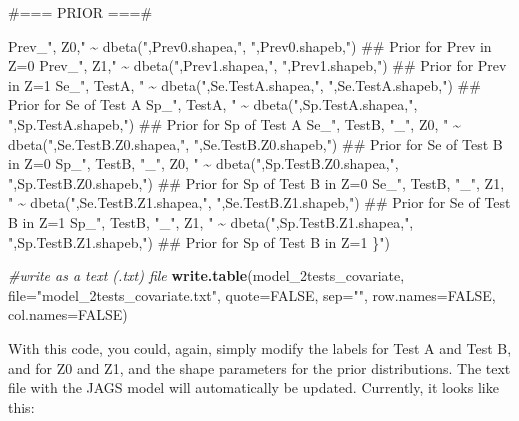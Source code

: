 \documentclass[
]{book}
\newenvironment{Shaded}{\begin{snugshade}}{\end{snugshade}}
\newcommand{\AttributeTok}[1]{\textcolor[rgb]{0.13,0.29,0.53}{#1}}
\newcommand{\CommentTok}[1]{\textcolor[rgb]{0.56,0.35,0.01}{\textit{#1}}}
\newcommand{\ConstantTok}[1]{\textcolor[rgb]{0.56,0.35,0.01}{#1}}
\newcommand{\FunctionTok}[1]{\textcolor[rgb]{0.13,0.29,0.53}{\textbf{#1}}}
\newcommand{\NormalTok}[1]{#1}
\newcommand{\StringTok}[1]{\textcolor[rgb]{0.31,0.60,0.02}{#1}}
\begin{document}
\begin{Shaded}
\begin{Highlighting}[]
\StringTok{\#=== PRIOR  ===\#}

\StringTok{  Prev\_"}\NormalTok{, Z0,}\StringTok{" \textasciitilde{} dbeta("}\NormalTok{,Prev0.shapea,}\StringTok{", "}\NormalTok{,Prev0.shapeb,}\StringTok{")  \#\# Prior for Prev in Z=0}
\StringTok{  Prev\_"}\NormalTok{, Z1,}\StringTok{" \textasciitilde{} dbeta("}\NormalTok{,Prev1.shapea,}\StringTok{", "}\NormalTok{,Prev1.shapeb,}\StringTok{")  \#\# Prior for Prev in Z=1}
\StringTok{  Se\_"}\NormalTok{, TestA, }\StringTok{" \textasciitilde{} dbeta("}\NormalTok{,Se.TestA.shapea,}\StringTok{", "}\NormalTok{,Se.TestA.shapeb,}\StringTok{")  \#\# Prior for Se of Test A}
\StringTok{  Sp\_"}\NormalTok{, TestA, }\StringTok{" \textasciitilde{} dbeta("}\NormalTok{,Sp.TestA.shapea,}\StringTok{", "}\NormalTok{,Sp.TestA.shapeb,}\StringTok{")  \#\# Prior for Sp of Test A}
\StringTok{  Se\_"}\NormalTok{, TestB, }\StringTok{"\_"}\NormalTok{, Z0, }\StringTok{" \textasciitilde{} dbeta("}\NormalTok{,Se.TestB.Z0.shapea,}\StringTok{", "}\NormalTok{,Se.TestB.Z0.shapeb,}\StringTok{")   \#\# Prior for Se of Test B in Z=0}
\StringTok{  Sp\_"}\NormalTok{, TestB, }\StringTok{"\_"}\NormalTok{, Z0, }\StringTok{" \textasciitilde{} dbeta("}\NormalTok{,Sp.TestB.Z0.shapea,}\StringTok{", "}\NormalTok{,Sp.TestB.Z0.shapeb,}\StringTok{")   \#\# Prior for Sp of Test B in Z=0}
\StringTok{  Se\_"}\NormalTok{, TestB, }\StringTok{"\_"}\NormalTok{, Z1, }\StringTok{" \textasciitilde{} dbeta("}\NormalTok{,Se.TestB.Z1.shapea,}\StringTok{", "}\NormalTok{,Se.TestB.Z1.shapeb,}\StringTok{")   \#\# Prior for Se of Test B in Z=1}
\StringTok{  Sp\_"}\NormalTok{, TestB, }\StringTok{"\_"}\NormalTok{, Z1, }\StringTok{" \textasciitilde{} dbeta("}\NormalTok{,Sp.TestB.Z1.shapea,}\StringTok{", "}\NormalTok{,Sp.TestB.Z1.shapeb,}\StringTok{")   \#\# Prior for Sp of Test B in Z=1}
\StringTok{  }
\StringTok{\}"}\NormalTok{)}

\CommentTok{\#write as a text (.txt) file}
\FunctionTok{write.table}\NormalTok{(model\_2tests\_covariate, }
            \AttributeTok{file=}\StringTok{"model\_2tests\_covariate.txt"}\NormalTok{, }
            \AttributeTok{quote=}\ConstantTok{FALSE}\NormalTok{, }
            \AttributeTok{sep=}\StringTok{""}\NormalTok{, }
            \AttributeTok{row.names=}\ConstantTok{FALSE}\NormalTok{,}
            \AttributeTok{col.names=}\ConstantTok{FALSE}\NormalTok{)}
\end{Highlighting}
\end{Shaded}

With this code, you could, again, simply modify the labels for Test A and Test B, and for Z0 and Z1, and the shape parameters for the prior distributions. The text file with the JAGS model will automatically be updated. Currently, it looks like this:
\end{document}
